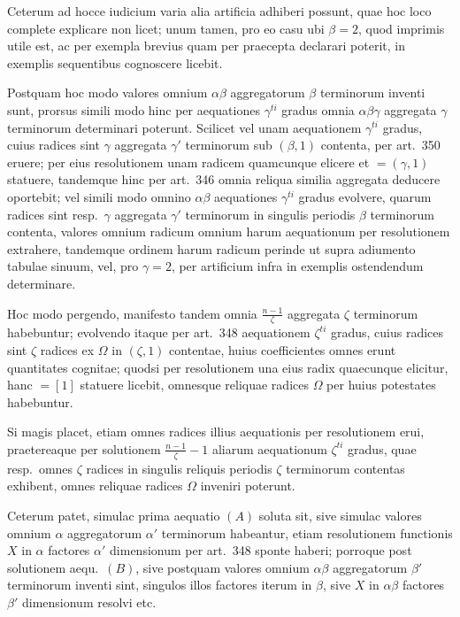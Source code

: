 \documentclass[12pt,a4paper]{article}
\theoremstyle{plain}
\theoremstyle{definition}
\theoremstyle{remark}
\begin{document}
Ceterum ad hocce iudicium varia alia artificia adhiberi possunt, quae hoc loco complete explicare non licet; unum tamen, pro eo casu ubi $\beta=2$, quod imprimis utile est, ac per exempla brevius quam per praecepta declarari poterit, in exemplis sequentibus cognoscere licebit.

Postquam hoc modo valores omnium $\alpha\beta$ aggregatorum $\beta$ terminorum inventi sunt, prorsus simili modo hinc per aequationes $\gamma^{ti}$ gradus omnia $\alpha\beta\gamma$ aggregata $\gamma$ terminorum determinari poterunt. Scilicet vel unam aequationem $\gamma^{ti}$ gradus, cuius radices sint $\gamma$ aggregata $\gamma'$ terminorum sub $(\beta,1)$ contenta, per art.\ 350 eruere; per eius resolutionem unam radicem quamcunque elicere et $=(\gamma,1)$ statuere, tandemque hinc per art.\ 346 omnia reliqua similia aggregata deducere oportebit; vel simili modo omnino $\alpha\beta$ aequationes $\gamma^{ti}$ gradus evolvere, quarum radices sint resp.\ $\gamma$ aggregata $\gamma'$ terminorum in singulis periodis $\beta$ terminorum contenta, valores omnium radicum omnium harum aequationum per resolutionem extrahere, tandemque ordinem harum radicum perinde ut supra adiumento tabulae sinuum, vel, pro $\gamma=2$, per artificium infra in exemplis ostendendum determinare.

Hoc modo pergendo, manifesto tandem omnia $\frac{n-1}{\zeta}$ aggregata $\zeta$ terminorum habebuntur; evolvendo itaque per art.\ 348 aequationem $\zeta^{ti}$ gradus, cuius radices sint $\zeta$ radices ex $\Omega$ in $(\zeta,1)$ contentae, huius coefficientes omnes erunt quantitates cognitae; quodsi per resolutionem una eius radix quaecunque elicitur, hanc $=[1]$ statuere licebit, omnesque reliquae radices $\Omega$ per huius potestates habebuntur.

Si magis placet, etiam omnes radices illius aequationis per resolutionem erui, praetereaque per solutionem $\frac{n-1}{\zeta}-1$ aliarum aequationum $\zeta^{ti}$ gradus, quae resp.\ omnes $\zeta$ radices in singulis reliquis periodis $\zeta$ terminorum contentas exhibent, omnes reliquae radices $\Omega$ inveniri poterunt.

Ceterum patet, simulac prima aequatio $(A)$ soluta sit, sive simulac valores omnium $\alpha$ aggregatorum $\alpha'$ terminorum habeantur, etiam resolutionem functionis $X$ in $\alpha$ factores $\alpha'$ dimensionum per art.\ 348 sponte haberi; porroque post solutionem aequ.\ $(B)$, sive postquam valores omnium $\alpha\beta$ aggregatorum $\beta'$ terminorum inventi sint, singulos illos factores iterum in $\beta$, sive $X$ in $\alpha\beta$ factores $\beta'$ dimensionum resolvi etc.
\end{document}
